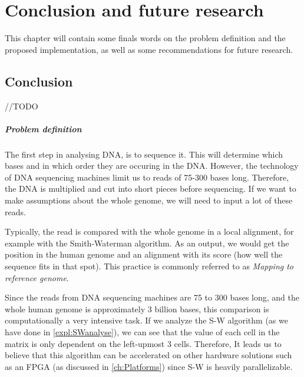 
\chapter{Conclusion and future research}
\label{ch:Conclusions}

This chapter will contain some finals words on the problem definition and the proposed implementation, as well as some recommendations for future research.

\section{Conclusion}

//TODO

\paragraph{Problem definition} 

The first step in analysing DNA, is to sequence it. This will determine which bases and in which order they are occuring in the DNA. However, the technology of DNA sequencing machines limit us to reads of 75-300 bases long. Therefore, the DNA is multiplied and cut into short pieces before sequencing. If we want to make assumptions about the whole genome, we will need to input a lot of these reads. 

Typically, the read is compared with the whole genome in a local alignment, for example with the Smith-Waterman algorithm. As an output, we would get the position in the human genome and an alignment with its score (how well the sequence fits in that spot). This practice is commonly referred to as \emph{Mapping to reference genome}.

Since the reads from DNA sequencing machines are 75 to 300 bases long, and the whole human genome is approximately 3 billion bases, this comparison is computationally a very intensive task. If we analyze the S-W algorithm (as we have done in \ref{expl:SWanalyse}), we can see that the value of each cell in the matrix is only dependent on the left-upmost 3 cells. Therefore, It leads us to believe that this algorithm can be accelerated on other hardware solutions such as an FPGA (as discussed in \ref{ch:Platforms}) since S-W is heavily parallelizable.

